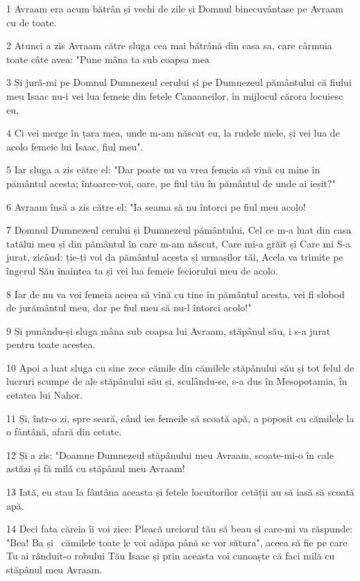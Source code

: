 \par 1 Avraam era acum bătrân și vechi de zile și Domnul binecuvântase pe Avraam cu de toate.
\par 2 Atunci a zis Avraam către sluga cea mai bătrână din casa sa, care cârmuia toate câte avea: "Pune mâna ta sub coapsa mea
\par 3 Și jură-mi pe Domnul Dumnezeul cerului și pe Dumnezeul pământului că fiului meu Isaac nu-i vei lua femeie din fetele Canaaneilor, în mijlocul cărora locuiesc eu,
\par 4 Ci vei merge în țara mea, unde m-am născut eu, la rudele mele, și vei lua de acolo femeie lui Isaac, fiul meu".
\par 5 Iar sluga a zis către el: "Dar poate nu va vrea femeia să vină cu mine în pământul acesta; întoarce-voi, oare, pe fiul tău în pământul de unde ai ieșit?"
\par 6 Avraam însă a zis către el: "Ia seama să nu întorci pe fiul meu acolo!
\par 7 Domnul Dumnezeul cerului și Dumnezeul pământului, Cel ce m-a luat din casa tatălui meu și din pământul în care m-am născut, Care mi-a grăit și Care mi S-a jurat, zicând: ție-ți voi da pământul acesta și urmașilor tăi, Acela va trimite pe îngerul Său înaintea ta și vei lua femeie feciorului meu de acolo.
\par 8 Iar de nu va voi femeia aceea să vină cu tine în pământul acesta, vei fi slobod de jurământul meu, dar pe fiul meu să nu-l întorci acolo!"
\par 9 Și punându-și sluga mâna sub coapsa lui Avraam, stăpânul său, i s-a jurat pentru toate acestea.
\par 10 Apoi a luat sluga cu sine zece cămile din cămilele stăpânului său și tot felul de lucruri scumpe de ale stăpânului său și, sculându-se, s-a dus în Mesopotamia, în cetatea lui Nahor.
\par 11 Și, într-o zi, spre seară, când ies femeile să scoată apă, a poposit cu cămilele la o fântână, afară din cetate.
\par 12 Și a zis: "Doamne Dumnezeul stăpânului meu Avraam, scoate-mi-o în cale astăzi și fă milă cu stăpânul meu Avraam!
\par 13 Iată, eu stau la fântâna aceasta și fetele locuitorilor cetății au să iasă să scoată apă.
\par 14 Deci fata căreia îi voi zice: Pleacă urciorul tău să beau și care-mi va răspunde: "Bea! Ba și  cămilele toate le voi adăpa până se vor sătura", aceea să fie pe care Tu ai rânduit-o robului Tău Isaac și prin aceasta voi cunoaște că faci milă cu stăpânul meu Avraam.
